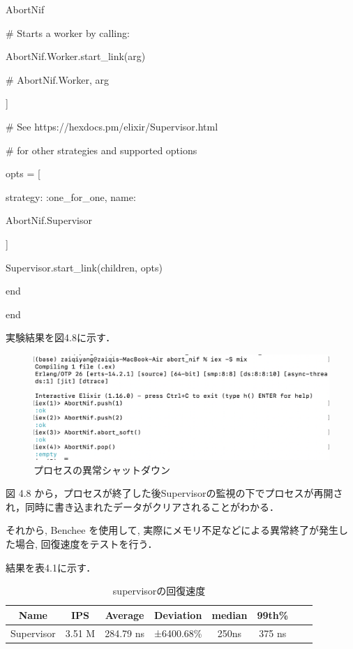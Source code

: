 \documentclass[a4paper]{jreport}	%
\begin{document}
        AbortNif

      \# Starts a worker by calling: 
      
      AbortNif.Worker.start\_link(arg)
      
      \# {AbortNif.Worker, arg}
      
    ]

    \# See https://hexdocs.pm/elixir/Supervisor.html
    
    \# for other strategies and supported options
    
    opts = [
    
    strategy: :one\_for\_one, name: 
    
    AbortNif.Supervisor
    
    ]
    
    Supervisor.start\_link(children, opts)
    
  end
  
end

実験結果を図4.8に示す．

\begin{figure}[H]
\vspace{3cm}
\begin{center}
\hspace{-8cm}
\includegraphics[scale=0.5]{ja/f11.png}
\end{center}
\caption{プロセスの異常シャットダウン}
\end{figure}

図 4.8 から，プロセスが終了した後Supervisorの監視の下でプロセスが再開され，同時に書き込まれたデータがクリアされることがわかる．

それから, Benchee を使用して, 実際にメモリ不足などによる異常終了が発生した場合, 回復速度をテストを行う．

結果を表4.1に示す．

\begin{table}[h]
  \centering
  
  \begin{tabular}{|c|c|c|c|c|c|c|c|}
    \hline
    Name & IPS & Average & Deviation & median & 99th\% \\
    \hline
Supervisor & 3.51 M  & 284.79 ns & ±6400.68\% & 250ns & 375 ns  \\
    \hline

  \end{tabular}
  \caption{supervisorの回復速度}
\end{table}
\end{document}
